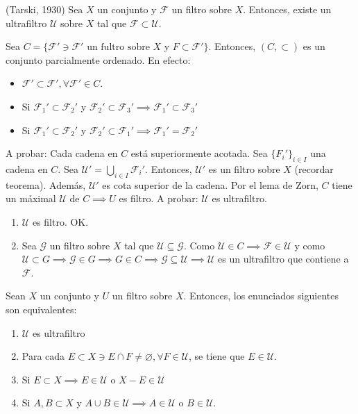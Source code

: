 \begin{teorema} (Tarski, 1930)
    Sea $X$ un conjunto y $\mathcal{F}$ un filtro sobre $X$. Entonces, existe un ultrafiltro $\mathcal{U}$ sobre $X$ tal que $\mathcal{F}\subset \mathcal{U}$. 
    \begin{dem}
        Sea $C=\{\mathcal{F}'\ni \mathcal{F}'\text{ un fultro sobre $X$ y $F\subset \mathcal{F}'$}\}$. Entonces, $(C,\subset)$ es un conjunto parcialmente ordenado. En efecto: 
        \begin{itemize}
            \item $\mathcal{F}'\subset \mathcal{F}',\forall \mathcal{F}' \in C$. 
            \item Si $\mathcal{F}_1'\subset \mathcal{F}_2'$ y $\mathcal{F}_2'\subset \mathcal{F}_3'\implies\mathcal{F}_1'\subset \mathcal{F}_3'$
            \item Si $\mathcal{F}_1'\subset \mathcal{F}_2'$ y $\mathcal{F}_2'\subset \mathcal{F}_1'\implies \mathcal{F}_1'=\mathcal{F}_2'$
        \end{itemize}
        A probar: Cada cadena en $C$ está superiormente acotada. Sea $\{F_i'\}_{i\in I}$ una cadena en $C$. Sea $\mathcal{U}'=\bigcup_{i\in I} \mathcal{F}_i'$. Entonces, $\mathcal{U}'$ es un filtro sobre $X$ (recordar teorema). Además, $\mathcal{U}'$ es cota superior de la cadena. Por el lema de Zorn, $C$ tiene un máximal $\mathcal{U}$ de $C\implies U $ es filtro. A probar: $\mathcal{U}$ es ultrafiltro. 
        \begin{enumerate}
            \item $\mathcal{U}$ es filtro. OK.
            \item Sea $\mathcal{G}$ un filtro sobre $X$ tal que $\mathcal{U}\subseteq \mathcal{G}$. Como $\mathcal{U}\in C\implies \mathcal{F}\in \mathcal{U}$ y como $\mathcal{U}\subset G\implies \mathcal{G}\in G\implies G\in C\implies \mathcal{G}\subseteq \mathcal{U}\implies \mathcal{U}$ es un ultrafiltro que contiene a $\mathcal{F}$.
        \end{enumerate}   
    \end{dem}
\end{teorema}

\begin{teorema}
    Sean $X$ un conjunto y $U$ un filtro sobre $X$. Entonces, los enunciados siguientes son equivalentes: 
    \begin{enumerate}
        \item $\mathcal{U}$ es ultrafiltro
        \item Para cada $E\subset X\ni E\cap F\neq \varnothing,\forall F\in \mathcal{U}$, se tiene que $E\in \mathcal{U}$.
        \item Si $E\subset X\implies E\in \mathcal{U}$ o $X-E\in \mathcal{U}$
        \item Si $A,B\subset X$ y $A\cup B \in \mathcal{U}\implies A\in \mathcal{U}$ o $B\in \mathcal{U}$. 
    \end{enumerate}
\end{teorema}


